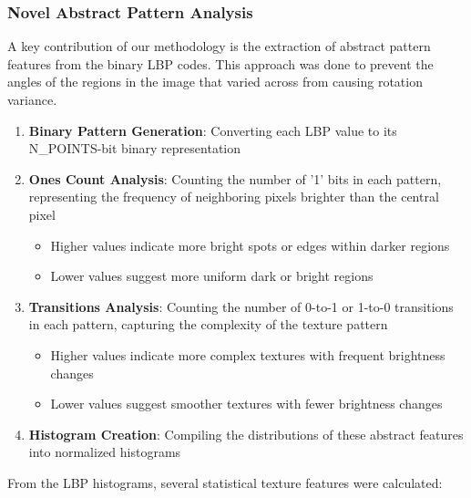 \documentclass[a4paper,12pt]{report}
\begin{document}
\subsubsection{Novel Abstract Pattern Analysis}

A key contribution of our methodology is the extraction of abstract pattern features from the binary LBP codes. This approach was done to prevent the angles of the regions in the image that varied across from causing rotation variance.

\begin{enumerate}
    \item \textbf{Binary Pattern Generation}: Converting each LBP value to its N\_POINTS-bit binary representation
    \item \textbf{Ones Count Analysis}: Counting the number of '1' bits in each pattern, representing the frequency of neighboring pixels brighter than the central pixel
    \begin{itemize}
        \item Higher values indicate more bright spots or edges within darker regions
        \item Lower values suggest more uniform dark or bright regions
    \end{itemize}
    \item \textbf{Transitions Analysis}: Counting the number of 0-to-1 or 1-to-0 transitions in each pattern, capturing the complexity of the texture pattern
    \begin{itemize}
        \item Higher values indicate more complex textures with frequent brightness changes
        \item Lower values suggest smoother textures with fewer brightness changes
    \end{itemize}
    \item \textbf{Histogram Creation}: Compiling the distributions of these abstract features into normalized histograms
\end{enumerate}

From the LBP histograms, several statistical texture features were calculated:
\end{document}
